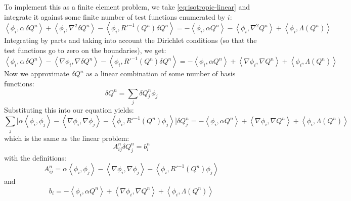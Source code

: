 \documentclass[reqno]{article}
\begin{document}
	To implement this as a finite element problem, we take \eqref{eq:isotropic-linear} and integrate it against some finite number of test functions enumerated by $i$:
	\begin{equation}
		\left< \phi_i, \alpha \, \delta Q^n \right>
		+ \left< \phi_i, \nabla^2 \delta Q^n \right>
		- \left< \phi_i, R'^{-1}(Q^n) \delta Q^n \right>
		=
		- \left< \phi_i, \alpha Q^n \right>
		- \left< \phi_i, \nabla^2 Q^n \right>
		+ \left< \phi_i, \Lambda(Q^n) \right>
	\end{equation}
	Integrating by parts and taking into account the Dirichlet conditions (so that the test functions go to zero on the boundaries), we get:
	\begin{equation}
		\left< \phi_i, \alpha \, \delta Q^n \right>
		- \left< \nabla \phi_i, \nabla \delta Q^n \right>
		- \left< \phi_i, R'^{-1}(Q^n) \delta Q^n \right>
		=
		- \left< \phi_i, \alpha Q^n \right>
		+ \left< \nabla \phi_i, \nabla Q^n \right>
		+ \left< \phi_i, \Lambda(Q^n) \right>
	\end{equation}
	Now we approximate $\delta Q^n$ as a linear combination of some number of basis functions:
	\begin{equation}
		\delta Q^n = \sum_j \delta Q^n_j \phi_j
	\end{equation}
	Substituting this into our equation yields:
	\begin{equation}
		\sum_j \biggl[
		\alpha \left< \phi_i, \phi_j \right>
		- \left< \nabla \phi_i, \nabla \phi_j \right>
		- \left< \phi_i, R'^{-1}(Q^n) \phi_j \right>
		\biggr] \delta Q^n_j
		=
		- \left< \phi_i, \alpha Q^n \right>
		+ \left< \nabla \phi_i, \nabla Q^n \right>
		+ \left< \phi_i, \Lambda(Q^n) \right>
	\end{equation}
	which is the same as the linear problem:
	\begin{equation}
		A^n_{ij} \delta Q^n_j = b^n_i
	\end{equation}
	with the definitions:
	\begin{equation}
		A^n_{ij} = 
		\alpha \left< \phi_i, \phi_j \right>
		- \left< \nabla \phi_i, \nabla \phi_j \right>
		- \left< \phi_i, R'^{-1}(Q^n) \phi_j \right>
	\end{equation}
	and
	\begin{equation}
		b_i =
		- \left< \phi_i, \alpha Q^n \right>
		+ \left< \nabla \phi_i, \nabla Q^n \right>
		+ \left< \phi_i, \Lambda(Q^n) \right>
	\end{equation}
\end{document}
